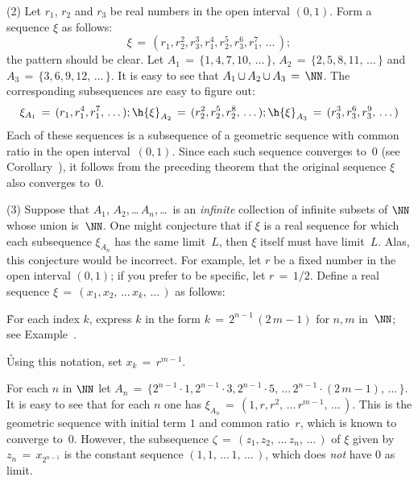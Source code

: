         (2) Let $r_{1}$, $r_{2}$ and $r_{3}$ be real numbers in the open interval $(0,1)$. Form a sequence ${\xi}$ as follows:
        \begin{displaymath}
        {\xi} \,=\, (r_{1}, r_{2}^{2}, r_{3}^{3},r_{1}^{4},r_{2}^{5}, r_{3}^{6},r_{1}^{7},\,{\ldots}\,);
        \end{displaymath}
    the pattern should be clear. Let $A_{1} \,=\, \{1, 4, 7, 10,\,{\ldots}\,\}$, $A_{2} \,=\, \{2, 5, 8, 11, \,{\ldots}\,\}$
     and $A_{3} \,=\, \{3, 6, 9, 12, \,{\ldots}\,\}$. It is easy to see that $A_{1}\,{\cup}\,A_{2}\,{\cup}\,A_{3} \,=\, {\NN}$.
    The corresponding subsequences are easy to figure out:
        \begin{displaymath}
        {\xi}_{A_{1}} \,=\, (r_{1}, r_{1}^{4}, r_{1}^{7},\,{\ldots}\,); \h
        {\xi}_{A_{2}} \,=\, (r_{2}^{2}, r_{2}^{5}, r_{2}^{8},\,{\ldots}\,); \h
        {\xi}_{A_{3}} \,=\, (r_{3}^{3}, r_{3}^{6}, r_{3}^{9},\,{\ldots}\,)
        \end{displaymath}
    Each of these sequences is a subsequence of a geometric sequence with common ratio in the open interval~$(0,1)$.
    Since each such sequence converges to~$0$ (see Corollary~), it follows
    from the preceding theorem that the original sequence ${\xi}$ also converges to~$0$.

\V

        (3) Suppose that $A_{1}$, $A_{2}$,\,{\ldots}\,$A_{n}$,\,{\ldots}\, is an {\em infinite} collection
    of infinite subsets of ${\NN}$ whose union is~${\NN}$. One might conjecture that if ${\xi}$ is a real sequence for which each subsequence ${\xi}_{A_{n}}$
    has the same limit~$L$, then ${\xi}$ itself must have limit~$L$. Alas, this conjecture would be incorrect.
    For example, let $r$ be a fixed number in the open interval $(0,1)$; if you prefer to be specific, let $r \,=\, 1/2$.
    Define a real sequence ${\xi} \,=\, (x_{1}, x_{2},\,{\ldots}\,x_{k},\,{\ldots}\,)$ as follows:

\VA

        \h For each index $k$, express $k$ in the form $k \,=\, 2^{n-1}\,(2\,m-1)$ for $n,m$ in~${\NN}$; see Example~.

        \h Using this notation, set $x_{k} \,=\, r^{m-1}$.

\VA

\noindent  For each $n$ in ${\NN}$ let $A_{n} \,=\, \{2^{n-1}{\cdot}1, 2^{n-1}{\cdot}3, 2^{n-1}{\cdot}5, \,{\ldots}\,2^{n-1}{\cdot}(2\,m-1),\,{\ldots}\,\}$.
    It is easy to see that for each $n$ one has ${\xi}_{A_{n}} \,=\, (1, r, r^{2},\,{\ldots}\,r^{m-1},\,{\ldots}\,)$.
    This is the geometric sequence with initial term $1$ and common ratio~$r$, which is known to converge to~$0$.
    However, the subsequence ${\zeta} \,=\, (z_{1}, z_{2},\,{\ldots}\,z_{n},\,{\ldots}\,)$ of ${\xi}$
    given by $z_{n} \,=\, x_{2^{n-1}}$ is the constant sequence $(1,1,\,{\ldots}\,1,\,{\ldots}\,)$, which does {\em not} have $0$ as limit.
    

